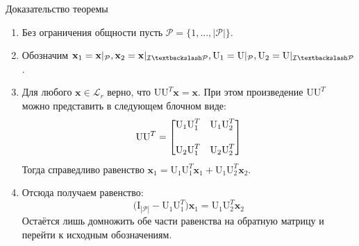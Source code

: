 \begin{frame}{Доказательство теоремы }
    \begin{enumerate}
        \item Без ограничения общности пусть $\mathcal{P} = \{1, ..., |\mathcal{P}| \}$.
        \item Обозначим $\mathbf{x}_1 = \mathbf{x}\vert_{\mathcal{P}}, \mathbf{x}_2 = \mathbf{x}\vert_{\mathcal{I} \textbackslash \mathcal{P}}, \text{U}_1 = \text{U}\vert_{\mathcal{P}}, \text{U}_2 = \text{U}\vert_{\mathcal{I} \textbackslash \mathcal{P}}$.
        \item Для любого $\mathbf{x} \in \mathcal{L}_r$ верно, что $\text{U}\text{U}^T\mathbf{x} = \mathbf{x}$. При этом произведение $\text{U}\text{U}^T$ можно представить в следующем блочном виде:
        $$ \text{U}\text{U}^T = \begin{bmatrix}
            \text{U}_1\text{U}_1^T & \text{U}_1 \text{U}_2^T \\
            \vspace{0.05cm}\\
            \text{U}_2 \text{U}_1^T & \text{U}_2 \text{U}_2^T
        \end{bmatrix}$$
        Тогда справедливо равенство $\mathbf{x}_1 = \text{U}_1\text{U}_1^T\mathbf{x}_1 + \text{U}_1 \text{U}_2^T \mathbf{x}_2$.
        \item Отсюда получаем равенство: 
        $$\Big(\text{I}_{|\mathcal{P}|} - \text{U}_1\text{U}_1^T\Big)\mathbf{x}_1 = \text{U}_1 \text{U}_2^T \mathbf{x}_2$$
        Остаётся лишь домножить обе части равенства на обратную матрицу и перейти к исходным обозначениям.
    \end{enumerate}
        

\end{frame}



